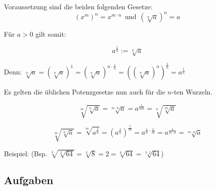 Voraussetzung sind die beiden folgenden Gesetze:
$$(x^m)^n = x^{m\cdot n}\ \ \textrm{und}\ \ \left(\sqrt[n]{a}\right)^n = a$$

Für $a > 0$ gilt somit:

\begin{definition}{}{}
  $$a^{\frac{1}{n}} := \sqrt[n]{a}$$
\end{definition}


Denn: $\sqrt[n]{a} = \left(\sqrt[n]{a}\right)^1 =
\left(\sqrt[n]{a}\right)^{n\cdot{}\frac{1}{n}} =
\left(\left(\sqrt[n]{a}\right)^n\right)^\frac{1}{n} = a^\frac{1}{n}$



Es gelten die üblichen Potenzgesetze nun auch für die $n$-ten
Wurzeln.


\begin{gesetz}{}{}
  $$\sqrt[m]{\sqrt[n]{a}} = \sqrt[m\cdot n]{a}=a^\frac1{mn} = \sqrt[n]{\sqrt[m]{a}}$$
\end{gesetz}


$$\sqrt[m]{\sqrt[n]{a}} =
\sqrt[m]{a^\frac{1}{n}}
= (a^{\frac{1}{n}})^{\frac{1}{m}} =
a^{\frac{1}{n}\cdot\frac{1}{m}} = a^{\frac{1}{m\cdot n}} =
\sqrt[m\cdot n]{a}$$


 Beispiel: (Bsp. $\sqrt[3]{\sqrt[2]{64}} =
    \sqrt[3]{8} = 2 = \sqrt[6]{64} = \sqrt[3\cdot2]{64}$)




\subsection{Aufgaben}
\newpage

